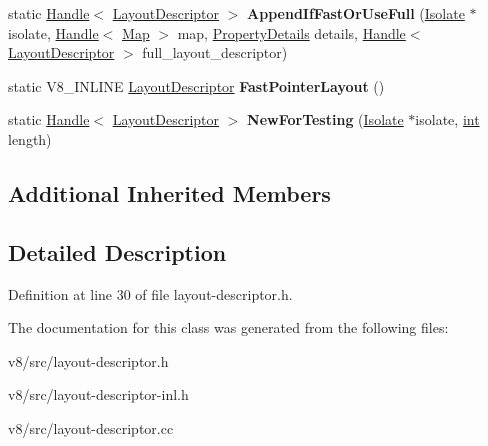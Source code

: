 \begin{DoxyCompactItemize}
static \mbox{\hyperlink{classv8_1_1internal_1_1Handle}{Handle}}$<$ \mbox{\hyperlink{classv8_1_1internal_1_1LayoutDescriptor}{Layout\+Descriptor}} $>$ {\bfseries Append\+If\+Fast\+Or\+Use\+Full} (\mbox{\hyperlink{classv8_1_1internal_1_1Isolate}{Isolate}} $\ast$isolate, \mbox{\hyperlink{classv8_1_1internal_1_1Handle}{Handle}}$<$ \mbox{\hyperlink{classv8_1_1internal_1_1Map}{Map}} $>$ map, \mbox{\hyperlink{classv8_1_1internal_1_1PropertyDetails}{Property\+Details}} details, \mbox{\hyperlink{classv8_1_1internal_1_1Handle}{Handle}}$<$ \mbox{\hyperlink{classv8_1_1internal_1_1LayoutDescriptor}{Layout\+Descriptor}} $>$ full\+\_\+layout\+\_\+descriptor)
\item 
\mbox{\label{classv8_1_1internal_1_1LayoutDescriptor_a293edc8bb2c5cda6adbb77307cf13d7d}} 
static V8\+\_\+\+I\+N\+L\+I\+NE \mbox{\hyperlink{classv8_1_1internal_1_1LayoutDescriptor}{Layout\+Descriptor}} {\bfseries Fast\+Pointer\+Layout} ()
\item 
\mbox{\label{classv8_1_1internal_1_1LayoutDescriptor_af10658d304188d0f37b679f2a4596c2e}} 
static \mbox{\hyperlink{classv8_1_1internal_1_1Handle}{Handle}}$<$ \mbox{\hyperlink{classv8_1_1internal_1_1LayoutDescriptor}{Layout\+Descriptor}} $>$ {\bfseries New\+For\+Testing} (\mbox{\hyperlink{classv8_1_1internal_1_1Isolate}{Isolate}} $\ast$isolate, \mbox{\hyperlink{classint}{int}} length)
\end{DoxyCompactItemize}
\subsection*{Additional Inherited Members}


\subsection{Detailed Description}


Definition at line 30 of file layout-\/descriptor.\+h.



The documentation for this class was generated from the following files\+:\begin{DoxyCompactItemize}
\item 
v8/src/layout-\/descriptor.\+h\item 
v8/src/layout-\/descriptor-\/inl.\+h\item 
v8/src/layout-\/descriptor.\+cc\end{DoxyCompactItemize}
